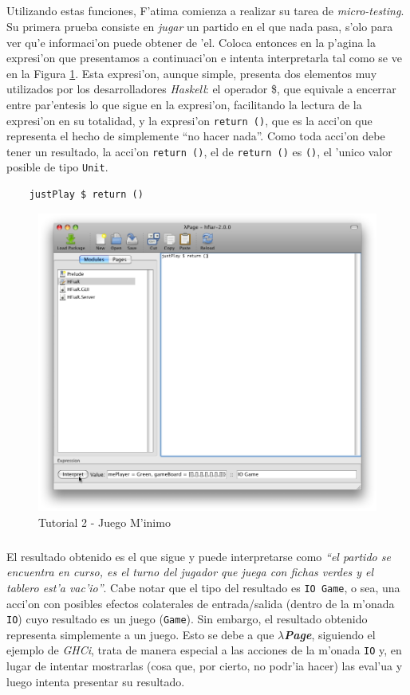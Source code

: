 \documentclass[a4paper]{article}
\newcommand{\haskell}{\textsl{Haskell}}
\newcommand{\hpage}{\textbf{\textsl{$\lambda$Page}}}
\begin{document}
\subparagraph{}Utilizando estas funciones, F'atima comienza a realizar su tarea de \textsl{micro-testing}.  Su primera prueba consiste en \textit{jugar} un partido en el que nada pasa, s'olo para ver qu'e informaci'on puede obtener de 'el.  Coloca entonces en la p'agina la expresi'on que presentamos a continuaci'on e intenta interpretarla tal como se ve en la Figura \ref{tut205}.  Esta expresi'on, aunque simple, presenta dos elementos muy utilizados por los desarrolladores \haskell: el operador \$, que equivale a encerrar entre par'entesis lo que sigue en la expresi'on, facilitando la lectura de la expresi'on en su totalidad, y la expresi'on \texttt{return ()}, que es la acci'on que representa el hecho de simplemente ``no hacer nada''.  Como toda acci'on debe tener un resultado, la acci'on \texttt{return ()}, el de \texttt{return ()} es \texttt{()}, el 'unico valor posible de tipo \texttt{Unit}.
\lstset{language=haskell, frame=single, tabsize=4}
\begin{center}\begin{lstlisting}
	justPlay $ return ()
\end{lstlisting}\end{center}
\begin{figure}[hp]
	\begin{center}
        	\includegraphics[width=.75\textwidth]{pictures/tut2/05}
		\caption{Tutorial 2 - Juego M'inimo}
		\label{tut205}
	\end{center}
\end{figure}
\subparagraph{}El resultado obtenido es el que sigue y puede interpretarse como \textsl{``el partido se encuentra en curso, es el turno del jugador que juega con fichas verdes y el tablero est'a vac'io''}.  Cabe notar que el tipo del resultado es \texttt{IO Game}, o sea, una acci'on con posibles efectos colaterales de entrada/salida (dentro de la m'onada \texttt{IO}) cuyo resultado es un juego (\texttt{Game}).  Sin embargo, el resultado obtenido representa simplemente a un juego.  Esto se debe a que \hpage, siguiendo el ejemplo de \textsl{GHCi}, trata de manera especial a las acciones de la m'onada \texttt{IO} y, en lugar de intentar mostrarlas (cosa que, por cierto, no podr'ia hacer) las eval'ua y luego intenta presentar su resultado.
\end{document}
